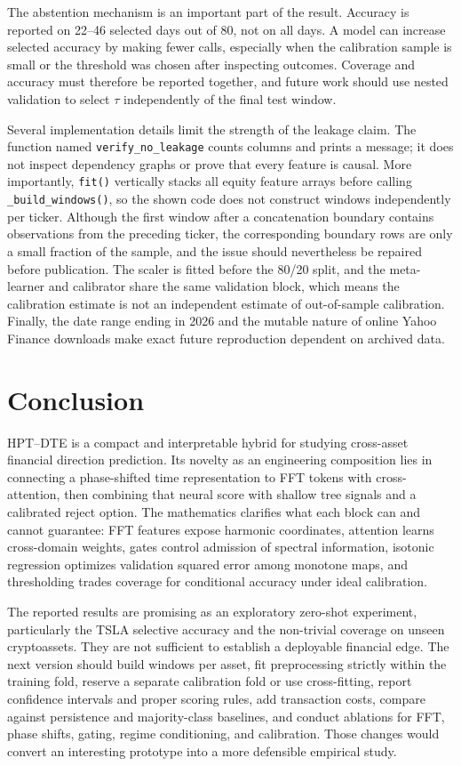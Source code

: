 \documentclass[11pt]{article}
\begin{document}
The abstention mechanism is an important part of the result. Accuracy is reported on 22--46 selected days out of 80, not on all days. A model can increase selected accuracy by making fewer calls, especially when the calibration sample is small or the threshold was chosen after inspecting outcomes. Coverage and accuracy must therefore be reported together, and future work should use nested validation to select $\tau$ independently of the final test window.

Several implementation details limit the strength of the leakage claim. The function named \texttt{verify\_no\_leakage} counts columns and prints a message; it does not inspect dependency graphs or prove that every feature is causal. More importantly, \texttt{fit()} vertically stacks all equity feature arrays before calling \texttt{\_build\_windows()}, so the shown code does not construct windows independently per ticker. Although the first window after a concatenation boundary contains observations from the preceding ticker, the corresponding boundary rows are only a small fraction of the sample, and the issue should nevertheless be repaired before publication. The scaler is fitted before the 80/20 split, and the meta-learner and calibrator share the same validation block, which means the calibration estimate is not an independent estimate of out-of-sample calibration. Finally, the date range ending in 2026 and the mutable nature of online Yahoo Finance downloads make exact future reproduction dependent on archived data.

\section{Conclusion}
HPT--DTE is a compact and interpretable hybrid for studying cross-asset financial direction prediction. Its novelty as an engineering composition lies in connecting a phase-shifted time representation to FFT tokens with cross-attention, then combining that neural score with shallow tree signals and a calibrated reject option. The mathematics clarifies what each block can and cannot guarantee: FFT features expose harmonic coordinates, attention learns cross-domain weights, gates control admission of spectral information, isotonic regression optimizes validation squared error among monotone maps, and thresholding trades coverage for conditional accuracy under ideal calibration.

The reported results are promising as an exploratory zero-shot experiment, particularly the TSLA selective accuracy and the non-trivial coverage on unseen cryptoassets. They are not sufficient to establish a deployable financial edge. The next version should build windows per asset, fit preprocessing strictly within the training fold, reserve a separate calibration fold or use cross-fitting, report confidence intervals and proper scoring rules, add transaction costs, compare against persistence and majority-class baselines, and conduct ablations for FFT, phase shifts, gating, regime conditioning, and calibration. Those changes would convert an interesting prototype into a more defensible empirical study.
\end{document}
